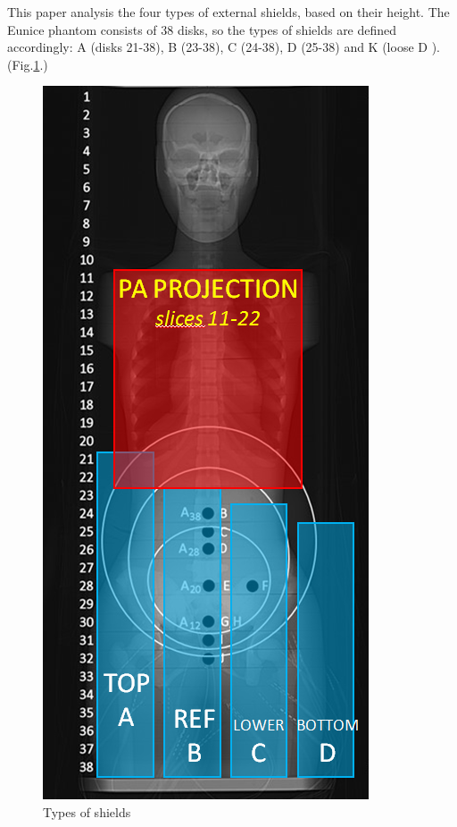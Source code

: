 \documentclass[fleqn,10pt]{SelfArx} %
\begin{document}
This paper analysis the four types of external shields, based on their height. The Eunice phantom consists of 38 disks, so the types of shields are defined accordingly: A (disks 21-38), B (23-38), C (24-38), D (25-38) and K (loose D ). (Fig.\ref{fig:Shields}.)

\begin{figure}[!hbt]\centering
\includegraphics[width=0.9\linewidth]{Shields}
\caption{Types of shields}
\label{fig:Shields}
\end{figure}
\end{document}
